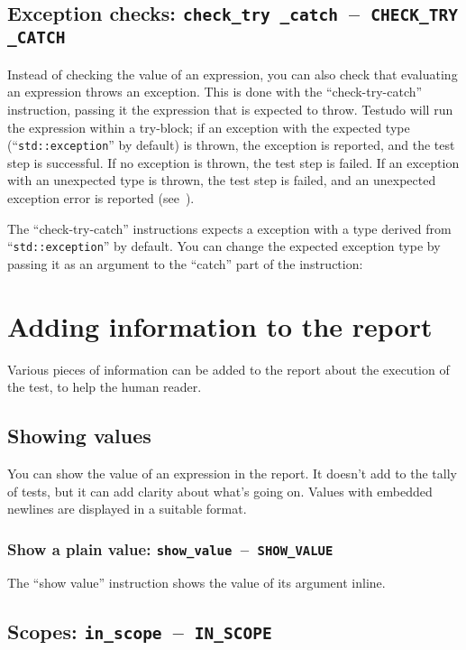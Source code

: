 \documentclass[twoside, a4paper, article]{memoir}
\newcommand*\testudocolor{\color{red!80!blue}}
\newcommand*\testudo[1]{\texttt{\testudocolor{}#1}}
\newcommand*\testudopair[2]{\testudo{#1}~--~\testudo{#2}}
\newcommand\subsectiontestudopair[3]{%
  \subsection[#1]{#1: \testudopair{#2}{#3}}}
\newcommand\subsubsectiontestudopair[3]{%
  \subsubsection[#1]{#1: \testudopair{#2}{#3}}}
\providecommand\typesetexample[1]{%
}
\begin{document}
\subsectiontestudopair{Exception checks}%
  {check\_try \_catch}{CHECK\_TRY \_CATCH}
\label{sec:exception-checks}

Instead of checking the value of an expression, you can also check that
evaluating an expression throws an exception.  This is done with the
``check-try-catch'' instruction, passing it the expression that is expected to
throw.  Testudo will run the expression within a try-block; if an exception
with the expected type (``\texttt{std::exception}'' by default) is thrown, the
exception is reported, and the test step is successful.  If no exception is
thrown, the test step is failed. If an exception with an unexpected type is
thrown, the test step is failed, and an unexpected exception error is reported
(see~).

\typesetexample{check-try-catch}

The ``check-try-catch'' instructions expects a exception with a type derived
from ``\texttt{std::exception}'' by default.  You can change the expected
exception type by passing it as an argument to the ``catch'' part of the
instruction:

\typesetexample{check-try-catch-exception}


\section{Adding information to the report}
\label{sec:adding-information-report}

Various pieces of information can be added to the report about the execution of
the test, to help the human reader.

\subsection{Showing values}
\label{sec:showing-values}

You can show the value of an expression in the report.  It doesn't add to the
tally of tests, but it can add clarity about what's going on.  Values with
embedded newlines are displayed in a suitable format.

\subsubsectiontestudopair{Show a plain value}%
  {show\_value}{SHOW\_VALUE}
\label{sec:show-plain-value}

The ``show value'' instruction shows the value of its argument inline.

\typesetexample{show-value}

\subsectiontestudopair{Scopes}{in\_scope}{IN\_SCOPE}
\label{sec:scopes}
\end{document}
